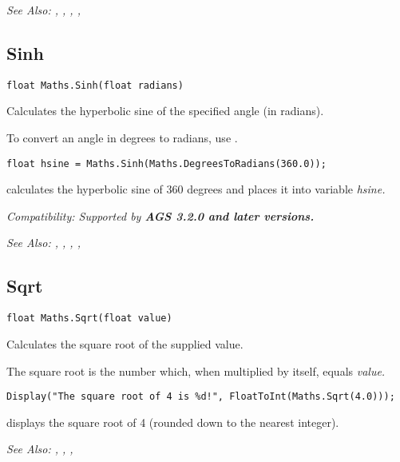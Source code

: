 \it{See Also:} ,
,
,
, 


\subsection{Sinh}\label{Maths.Sinh}%

\begin{verbatim}
float Maths.Sinh(float radians)
\end{verbatim}
Calculates the hyperbolic sine of the specified angle (in radians).

To convert an angle in degrees to radians, use .

\begin{verbatim}
float hsine = Maths.Sinh(Maths.DegreesToRadians(360.0));
\end{verbatim}
calculates the hyperbolic sine of 360 degrees and places it into variable \it{hsine}.

\it{Compatibility:} Supported by \bf{AGS 3.2.0} and later versions.

\it{See Also:} ,
,
,
, 


\subsection{Sqrt}\label{Maths.Sqrt}%

\begin{verbatim}
float Maths.Sqrt(float value)
\end{verbatim}
Calculates the square root of the supplied value.

The square root is the number which, when multiplied by itself, equals \it{value}.

\begin{verbatim}
Display("The square root of 4 is %d!", FloatToInt(Maths.Sqrt(4.0)));
\end{verbatim}
displays the square root of 4 (rounded down to the nearest integer).

\it{See Also:} ,
,
, 


